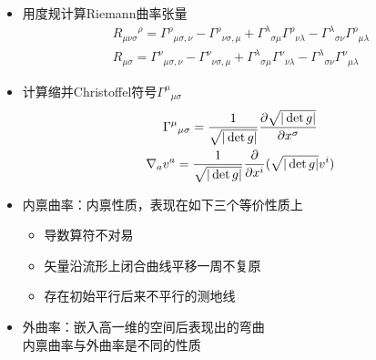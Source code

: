 \begin{itemize}
\begin{itemize}
\begin{itemize}
\begin{gather*}
                \\
                C_{[abc]d}=0
            \end{gather*}
        \end{itemize}
        \item 广义Riemann空间的Einstein张量
        \begin{gather*}
            G_{ab}=R_{ab}-\frac{1}{2}Rg_{ab}
        \end{gather*}
        \begin{itemize}
            \item $\nabla^a G_{ab}=g^{ac} \nabla_c G_{ab}=0$
        \end{itemize}
    \end{itemize}
    \item 用度规计算Riemann曲率张量
    \begin{gather*}
        {R_{\mu \nu \sigma}}^{\rho}={\Gamma^\rho}_{\mu \sigma ,\nu}-{\Gamma^\rho}_{\nu \sigma ,\mu}+{\Gamma^{\lambda}}_{\sigma \mu} {\Gamma^{\rho}}_{\nu \lambda}-{\Gamma^{\lambda}}_{\sigma \nu} {\Gamma^{\rho}}_{\mu \lambda}
        \\
        R_{\mu \sigma}={\Gamma^\nu}_{\mu \sigma ,\nu}-{\Gamma^\nu}_{\nu \sigma ,\mu}+{\Gamma^{\lambda}}_{\sigma \mu} {\Gamma^{\nu}}_{\nu \lambda}-{\Gamma^{\lambda}}_{\sigma \nu} {\Gamma^{\nu}}_{\mu \lambda}
    \end{gather*}
    \item 计算缩并Christoffel符号${\Gamma^\mu}_{\mu \sigma}$
    \begin{gather*}
        {\Gamma^\mu}_{\mu \sigma}=\frac{1}{\sqrt{|\det g|}}\frac{\partial \sqrt{|\det g|}}{\partial x^{\sigma}}
        \\
        \nabla_a v^a=\frac{1}{\sqrt{|\det g|}}\frac{\partial }{\partial x^{i}}(\sqrt{|\det g|} v^{i})
    \end{gather*}
    \item 内禀曲率：内禀性质，表现在如下三个等价性质上
    \begin{itemize}
        \item 导数算符不对易
        \item 矢量沿流形上闭合曲线平移一周不复原
        \item 存在初始平行后来不平行的测地线
    \end{itemize}
    \item 外曲率：嵌入高一维的空间后表现出的弯曲\\
    内禀曲率与外曲率是不同的性质
\end{itemize}